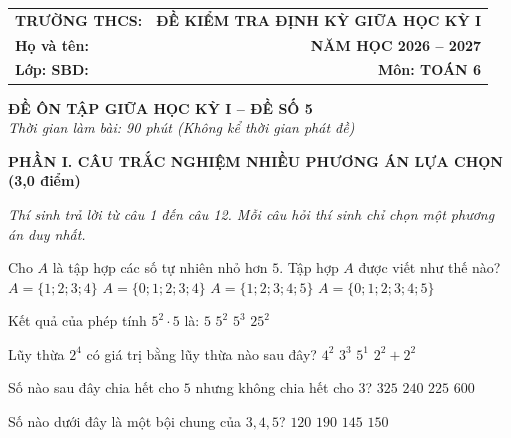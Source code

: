 \documentclass[12pt,a4paper]{article}
\begin{document}
\noindent
\begin{tabularx}{\linewidth}{X r}
\textbf{TRƯỜNG THCS: \dotfill} & \textbf{ĐỀ KIỂM TRA ĐỊNH KỲ GIỮA HỌC KỲ I} \\
\textbf{Họ và tên: \dotfill} & \textbf{NĂM HỌC 2026 -- 2027} \\
\textbf{Lớp: \dotfill \quad SBD: \dotfill} & \textbf{Môn: TOÁN 6} \\
\hline
\end{tabularx}
\vspace{2mm}

\begin{center}
  \textbf{\large ĐỀ ÔN TẬP GIỮA HỌC KỲ I -- ĐỀ SỐ 5}\\
  \textit{Thời gian làm bài: 90 phút (Không kể thời gian phát đề)}
\end{center}
\vspace{1mm}

\noindent\textbf{\large PHẦN I. CÂU TRẮC NGHIỆM NHIỀU PHƯƠNG ÁN LỰA CHỌN (3,0 điểm)}

\textit{Thí sinh trả lời từ câu 1 đến câu 12. Mỗi câu hỏi thí sinh chỉ chọn một phương án duy nhất.}

\vspace{1mm}
\begin{ex}
Cho $A$ là tập hợp các số tự nhiên nhỏ hơn $5$. Tập hợp $A$ được viết như thế nào?
\choice
{$A = \{1; 2; 3; 4\}$}
{\True $A = \{0; 1; 2; 3; 4\}$}
{$A = \{1; 2; 3; 4; 5\}$}
{$A = \{0; 1; 2; 3; 4; 5\}$}
\end{ex}

\begin{ex}
Kết quả của phép tính $5^2 \cdot 5$ là:
\choice
{$5$}
{$5^2$}
{\True $5^3$}
{$25^2$}
\end{ex}

\begin{ex}
Lũy thừa $2^4$ có giá trị bằng lũy thừa nào sau đây?
\choice
{\True $4^2$}
{$3^3$}
{$5^1$}
{$2^2 + 2^2$}
\end{ex}

\begin{ex}
Số nào sau đây chia hết cho $5$ nhưng không chia hết cho $3$?
\choice
{\True $325$}
{$240$}
{$225$}
{$600$}
\end{ex}

\begin{ex}
Số nào dưới đây là một bội chung của $3, 4, 5$?
\choice
{\True $120$}
{$190$}
{$145$}
{$150$}
\end{ex}
\end{document}
